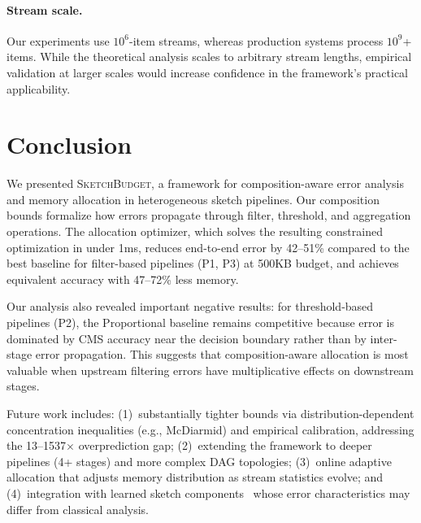 \documentclass[preprint]{article}
\newcommand{\SketchBudget}{\textsc{SketchBudget}}
\begin{document}
\paragraph{Stream scale.}
Our experiments use $10^6$-item streams, whereas production systems process $10^9$+ items. While the theoretical analysis scales to arbitrary stream lengths, empirical validation at larger scales would increase confidence in the framework's practical applicability.

\section{Conclusion}
\label{sec:conclusion}

We presented \SketchBudget{}, a framework for composition-aware error analysis and memory allocation in heterogeneous sketch pipelines. Our composition bounds formalize how errors propagate through filter, threshold, and aggregation operations. The allocation optimizer, which solves the resulting constrained optimization in under 1ms, reduces end-to-end error by 42--51\% compared to the best baseline for filter-based pipelines (P1, P3) at 500KB budget, and achieves equivalent accuracy with 47--72\% less memory.

Our analysis also revealed important negative results: for threshold-based pipelines (P2), the Proportional baseline remains competitive because error is dominated by CMS accuracy near the decision boundary rather than by inter-stage error propagation. This suggests that composition-aware allocation is most valuable when upstream filtering errors have multiplicative effects on downstream stages.

Future work includes: (1)~substantially tighter bounds via distribution-dependent concentration inequalities (e.g., McDiarmid) and empirical calibration, addressing the 13--1537$\times$ overprediction gap; (2)~extending the framework to deeper pipelines (4+ stages) and more complex DAG topologies; (3)~online adaptive allocation that adjusts memory distribution as stream statistics evolve; and (4)~integration with learned sketch components~\citep{mitzenmacher2018model, dolera2023learning} whose error characteristics may differ from classical analysis.


\end{document}
